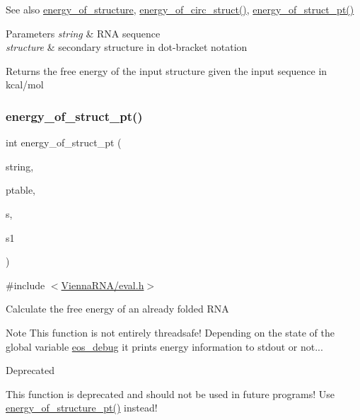 \begin{DoxySeeAlso}{See also}
\mbox{\hyperlink{group__eval_gaf93986cb3cb29770ec9cca69c9fab8cf}{energy\+\_\+of\+\_\+structure}}, \mbox{\hyperlink{group__eval_ga657222e2758c46bf13b416ef3032e417}{energy\+\_\+of\+\_\+circ\+\_\+struct()}}, \mbox{\hyperlink{group__eval_ga27ce6f68512d43bf1fe14a06c9d76d5c}{energy\+\_\+of\+\_\+struct\+\_\+pt()}} 
\end{DoxySeeAlso}

\begin{DoxyParams}{Parameters}
{\em string} & R\+NA sequence \\
\hline
{\em structure} & secondary structure in dot-\/bracket notation \\
\hline
\end{DoxyParams}
\begin{DoxyReturn}{Returns}
the free energy of the input structure given the input sequence in kcal/mol 
\end{DoxyReturn}
\mbox{\label{group__eval_ga27ce6f68512d43bf1fe14a06c9d76d5c}} 
\subsubsection{\texorpdfstring{energy\+\_\+of\+\_\+struct\+\_\+pt()}{energy\_of\_struct\_pt()}}
{\footnotesize\ttfamily int energy\+\_\+of\+\_\+struct\+\_\+pt (\begin{DoxyParamCaption}\item[{const char $\ast$}]{string,  }\item[{short $\ast$}]{ptable,  }\item[{short $\ast$}]{s,  }\item[{short $\ast$}]{s1 }\end{DoxyParamCaption})}



{\ttfamily \#include $<$\mbox{\hyperlink{eval_8h}{Vienna\+R\+N\+A/eval.\+h}}$>$}

Calculate the free energy of an already folded R\+NA

\begin{DoxyNote}{Note}
This function is not entirely threadsafe! Depending on the state of the global variable \mbox{\hyperlink{group__eval_ga567530678f6260a1a649a5beca5da4c5}{eos\+\_\+debug}} it prints energy information to stdout or not...~\newline
 
\end{DoxyNote}
\begin{DoxyRefDesc}{Deprecated}
\item[\mbox{\hyperlink{deprecated__deprecated000062}{Deprecated}}]This function is deprecated and should not be used in future programs! Use \mbox{\hyperlink{group__eval_ga8831445966b761417e713360791299d8}{energy\+\_\+of\+\_\+structure\+\_\+pt()}} instead!\end{DoxyRefDesc}


